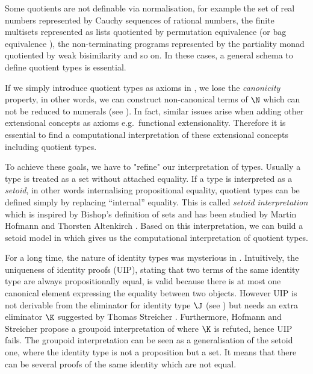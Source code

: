Some quotients are not definable via normalisation, for example the
set of real numbers represented by Cauchy sequences of rational
numbers, the finite multisets represented as lists quotiented by
permutation equivalence (or bag equivalence
\cite{DBLP:conf/itp/Danielsson12}), the non-terminating programs
represented by the partiality monad quotiented by weak bisimilarity
and so on. In these cases, a general schema to define quotient types
is essential.

If we simply introduce quotient types as axioms in \itt, we lose the
\emph{canonicity} property, in other words, we can construct
non-canonical terms of $\N$ which can not be reduced to numerals (see
). In fact, similar issues arise when adding
other extensional concepts as axioms e.g.\ functional
extensionality. Therefore it is essential to find a computational
interpretation of these extensional concepts including quotient types.

To achieve these goals, we have to "refine" our interpretation of
types. Usually a type is treated as a set without attached
equality. If a type is interpreted as a \emph{setoid}, in other words
internalising propositional equality, quotient types can be defined
simply by replacing ``internal'' equality. This is called \emph{setoid
  interpretation} which is inspired by Bishop's \cite{bishop}
definition of sets and has been studied by Martin Hofmann
\cite{hof:phd,hof:95:sm} and Thorsten Altenkirch
\cite{alti:lics99,alti:ott-conf}. Based on this interpretation, we can
build a setoid model in \itt which gives us the computational
interpretation of quotient types.

For a long time, the nature of identity types was mysterious in
\itt. Intuitively, the uniqueness of identity proofs (UIP), stating
that two terms of the same identity type are always propositionally
equal, is valid because there is at most one canonical element
expressing the equality between two objects. However UIP is not
derivable from the eliminator for identity type $\J$ (see
) but needs an extra eliminator $\K$ suggested by
Thomas Streicher \cite{streicherinvestigations}.  Furthermore, Hofmann
and Streicher \cite{MR1686862} propose a groupoid interpretation of
\itt where $\K$ is refuted, hence UIP fails. The groupoid
interpretation can be seen as a generalisation of the setoid one,
where the identity type is not a proposition but a set. It means that
there can be several proofs of the same identity which are not equal.

